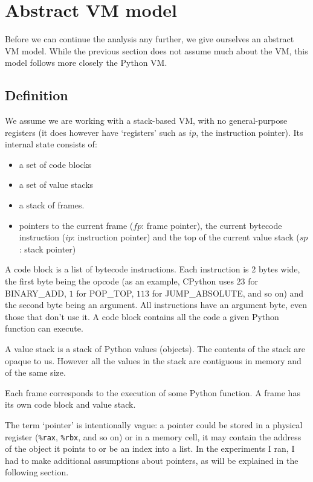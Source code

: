 \documentclass[english]{article}
\begin{document}
\section{Abstract VM model}

Before we can continue the analysis any further, we give ourselves an abstract VM model. While the previous section does not assume much about the VM, this model follows more closely the Python VM.
\subsection{Definition}

We assume we are working with a stack-based VM, with no general-purpose registers (it does however have `registers' such as $ip$, the instruction pointer). Its internal state consists of:
\begin{itemize}
	\item a set of code blocks 
	\item a set of value stacks 
	\item a stack of frames.  
	\item pointers to the current frame ($fp$: frame pointer), the current bytecode instruction ($ip$: instruction pointer) and the top of the current value stack ($sp$: stack pointer)
\end{itemize}

A code block is a list of bytecode instructions. Each instruction is 2 bytes wide, the first byte being the opcode (as an example, CPython uses $23$ for BINARY\_ADD, $1$ for POP\_TOP, $113$ for JUMP\_ABSOLUTE, and so on) and the second byte being an argument. All instructions have an argument byte, even those that don't use it. A code block contains all the code a given Python function can execute.

A value stack is a stack of Python values (objects). The contents of the stack are opaque to us. However all the values in the stack are contiguous in memory and of the same size.

Each frame corresponds to the execution of some Python function. A frame has its own code block and value stack.

The term `pointer' is intentionally vague: a pointer could be stored in a physical register (\texttt{\%rax}, \texttt{\%rbx}, and so on) or in a memory cell, it may contain the address of the object it points to or be an index into a list. In the experiments I ran, I had to make additional assumptions about pointers, as will be explained in the following section.
\end{document}
